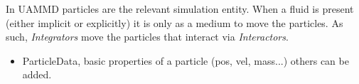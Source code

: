 \documentclass[ twoside,openright,titlepage,numbers=noenddot,%
headinclude,footinclude,cleardoublepage=empty,abstract=on,
BCOR=5mm,paper=a4,fontsize=11pt, dvipsnames
]{scrreprt}
\newcommand{\uammd}{\gls{UAMMD}\xspace}
\begin{document}
In \uammd particles are the relevant simulation entity. When a fluid is present (either implicit or explicitly) it is only as a medium to move the particles. As such, \emph{Integrators} move the particles that interact via \emph{Interactors}.


\begin{itemize}
\item ParticleData, basic properties of a particle (pos, vel, mass...) others can be added.
\end{itemize}


%
%

%
\end{document}
